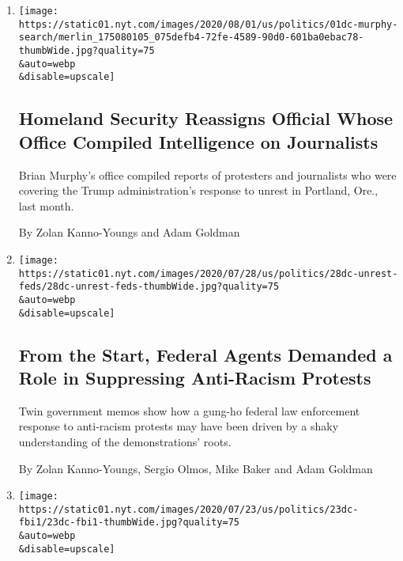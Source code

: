 \begin{enumerate}
\def\labelenumi{\arabic{enumi}.}
\item
  \href{/2020/08/01/us/politics/brian-murphy-homeland-security-protesters.html}{}

  \texttt{[image: https://static01.nyt.com/images/2020/08/01/us/politics/01dc-murphy-search/merlin\_175080105\_075defb4-72fe-4589-90d0-601ba0ebac78-thumbWide.jpg?quality=75\\\&auto=webp\\\&disable=upscale]}

  \hypertarget{homeland-security-reassigns-official-whose-office-compiled-intelligence-on-journalists}{%
  \subsection{Homeland Security Reassigns Official Whose Office Compiled
  Intelligence on
  Journalists}\label{homeland-security-reassigns-official-whose-office-compiled-intelligence-on-journalists}}

  Brian Murphy's office compiled reports of protesters and journalists
  who were covering the Trump administration's response to unrest in
  Portland, Ore., last month.

  By Zolan Kanno-Youngs and Adam Goldman
\item
  \href{/2020/07/28/us/federal-agents-portland-seattle-protests.html}{}

  \texttt{[image: https://static01.nyt.com/images/2020/07/28/us/politics/28dc-unrest-feds/28dc-unrest-feds-thumbWide.jpg?quality=75\\\&auto=webp\\\&disable=upscale]}

  \hypertarget{from-the-start-federal-agents-demanded-a-role-in-suppressing-anti-racism-protests}{%
  \subsection{From the Start, Federal Agents Demanded a Role in
  Suppressing Anti-Racism
  Protests}\label{from-the-start-federal-agents-demanded-a-role-in-suppressing-anti-racism-protests}}

  Twin government memos show how a gung-ho federal law enforcement
  response to anti-racism protests may have been driven by a shaky
  understanding of the demonstrations' roots.

  By Zolan Kanno-Youngs, Sergio Olmos, Mike Baker and Adam Goldman
\item
  \href{/2020/07/25/us/politics/igor-danchenko-steele-dossier.html}{}

  \texttt{[image: https://static01.nyt.com/images/2020/07/23/us/politics/23dc-fbi1/23dc-fbi1-thumbWide.jpg?quality=75\\\&auto=webp\\\&disable=upscale]}


\end{enumerate}
